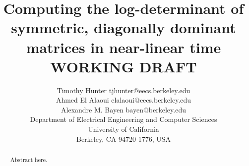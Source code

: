 \documentclass[onefignum,onetabnum]{siamltex1213}
\title{Computing the log-determinant of symmetric, diagonally dominant matrices
in near-linear time\\
WORKING DRAFT}
\author{\name Timothy Hunter \email tjhunter@eecs.berkeley.edu \\
       \name Ahmed {El Alaoui} \email elalaoui@eecs.berkeley.edu \\
       \name Alexandre M. Bayen \email bayen@berkeley.edu \\
       \addr Department of Electrical Engineering and Computer Sciences\\
       University of California\\
       Berkeley, CA 94720-1776, USA}
\begin{document}
\maketitle

\begin{abstract}
Abstract here.
\end{abstract}

\begin{keywords}\end{keywords}

\begin{AMS}\end{AMS}

















% 

% 
\end{document}

